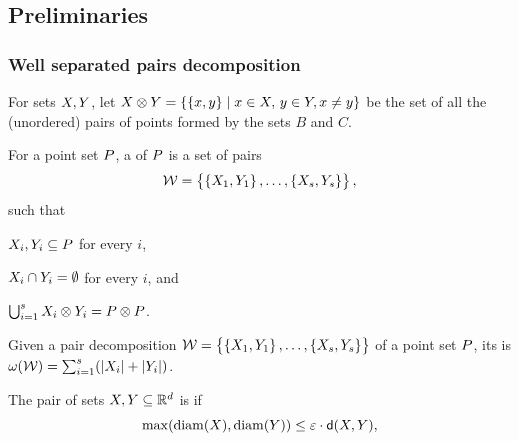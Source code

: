 \documentclass[12pt]{article}%
\begin{document}
\subsection{Preliminaries}

\subsubsection{Well separated pairs decomposition}

For sets $X, Y$, let
\begin{math}
    \PSX \otimes \PSY%
    =%
    \Set{\brc{\px,\py}}{ \px\in \PSX,\, \py\in \PSY, \px \ne \py }
\end{math}
be the set of all the (unordered) pairs of points formed by the sets
$B$ and $C$.

\begin{defn}
    For a point set $P$, a  of $P$ is a set of pairs
    \begin{equation*}
        \mathcal{W} = \left\{ {\bigl. \left\{ {X_1,Y_1} \right\},\ldots,\left\{ {X_s,Y_s} \right\}} \right\},
    \end{equation*}
    such that
    \begin{enumerate*}[label=(\Roman*)]
        \item $X_i,Y_i\subseteq P$ for every $i$,
        \item $X_i \cap Y_i = \emptyset$ for every $i$, and
        \item
        $\bigcup_{i=1}^s X_i \otimes Y_i = P \otimes P$.
    \end{enumerate*}
\end{defn}

\begin{defn}
    Given a pair decomposition
    $\mathcal{W} = \left\{ {\bigl. \left\{ {X_1,Y_1} \right\},\ldots,\left\{ {X_s,
          Y_s} \right\}} \right\}$ of a point set $P$, its  is
    $\WeightX{\WS} = \sum_{i=1}^s \pth{ \cardin{\PSX_i } +
       \cardin{\PSY_i}}$.
\end{defn}


\begin{defn}
    The pair of sets $X, Y \subseteq \mathbb{R}^d$ is
     if
    \begin{equation*}
        \max \pth{ \diameterX{\PSX}, \diameterX{\PSY} } \leq
        \eps \cdot \dsY{\PSX}{\PSY},
    \end{equation*}
\end{defn}
\end{document}
